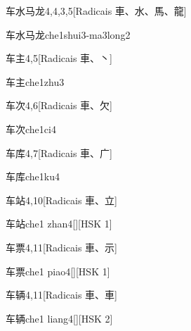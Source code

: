 \begin{entry}{车水马龙}{4,4,3,5}[Radicais ⾞、⽔、⾺、⿓]
  \begin{phonetics}{车水马龙}{che1shui3-ma3long2}
  \end{phonetics}
\end{entry}

\begin{entry}{车主}{4,5}[Radicais ⾞、⼂]
  \begin{phonetics}{车主}{che1zhu3}
  \end{phonetics}
\end{entry}

\begin{entry}{车次}{4,6}[Radicais ⾞、⽋]
  \begin{phonetics}{车次}{che1ci4}
  \end{phonetics}
\end{entry}

\begin{entry}{车库}{4,7}[Radicais ⾞、⼴]
  \begin{phonetics}{车库}{che1ku4}
  \end{phonetics}
\end{entry}

\begin{entry}{车站}{4,10}[Radicais ⾞、⽴]
  \begin{phonetics}{车站}{che1 zhan4}[][HSK 1]
  \end{phonetics}
\end{entry}

\begin{entry}{车票}{4,11}[Radicais ⾞、⽰]
  \begin{phonetics}{车票}{che1 piao4}[][HSK 1]
  \end{phonetics}
\end{entry}

\begin{entry}{车辆}{4,11}[Radicais ⾞、⾞]
  \begin{phonetics}{车辆}{che1 liang4}[][HSK 2]
  \end{phonetics}
\end{entry}

